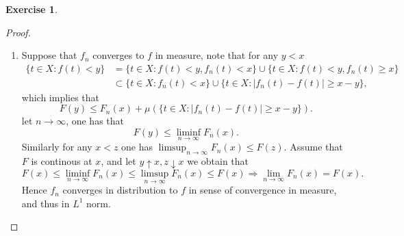 \documentclass[a4paper]{article}
\newtheorem{ex}{Exercise}[subsection]
\begin{document}
\begin{ex}\end{ex}\begin{proof}\ 
\begin{enumerate}[label = (\roman*)]
    \item Suppose that $f_n$ converges to $f$ in measure, note that for any $y < x$\begin{align*}
    \{t \in X : f(t) < y\} &= \{t \in X : f(t) < y, f_n(t) < x\} \cup \{t \in X : f(t) < y, f_n(t) \geq x\}\\
    &\subset \{t \in X : f_n(t) < x\} \cup \{t \in X : |f_n(t) - f(t)| \geq x - y\},
    \end{align*}which implies that$$
    F(y) \leq F_n(x) + \mu(\{t \in X : |f_n(t) - f(t)| \geq x - y\}).
    $$let $n \to \infty$, one has that $$
    F(y) \leq \liminf_{n \to \infty} F_n(x).
    $$Similarly for any $x < z$ one has $\limsup_{n \to\infty} F_n(x) \leq F(z)$. Assume that $F$ is continous at 
    $x$, and let $y \uparrow x, z \downarrow x$ we obtain that $$
    F(x) \leq \liminf_{n \to\infty} F_n(x) \leq \limsup_{n \to\infty} F_n(x) \leq F(x) \Rightarrow \lim_{n \to \infty}
    F_n(x) = F(x).
    $$Hence $f_n$ converges in distribution to $f$ in sense of convergence in measure, and thus in $L^1$ norm.


\end{enumerate}
\end{proof}
\end{document}
